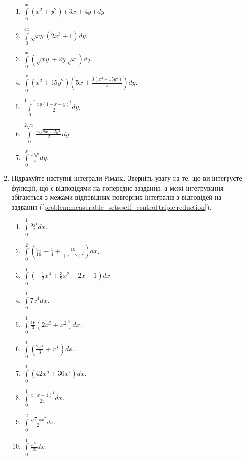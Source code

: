 \begin{enumerate}
\begin{multicols}{2}
\begin{enumerate}[label*=\arabic*.]
        \item $\int\limits_{0}^{x} \left(x^{2}+y^{2}\right) \left(3 x+4 y\right)d y$.
        \item $\int\limits_{0}^{4 x} \sqrt{x y} \left(2 x^{3} + 1\right)  d y$.
        \item $\int\limits_{0}^{x}\left(\sqrt{x y}+2 {{y}}\, \sqrt{ x}\right)d y$.
        \item $\int\limits_{0}^{x}\left(x^{2}+15 y^{2}\right)\left(5 x +\frac{3 \left(x^{2}+15 y^{2}\right)}{4}\right)d y$.
        \item $\int\limits_{0}^{1-x}\frac{x y \left(1-x-y\right)^{2}}{2}d y$.
        \item $\int\limits_{0}^{2 {\sqrt{x}}}\frac{x \sqrt{8 x - 2 y^{2}}}{2}d y$.
        \item $\int\limits_{0}^{x}\frac{x^{5} y^{6}}{4}d y$.
    \end{enumerate}
\end{multicols}
\item\label{problem:measurable_sets:self_control:triple:outer} Підрахуйте наступні інтеграли Рімана. Зверніть увагу на те, що ви інтегруєте функціїї, що є відповідями на попереднє завдання, а межі інтегрування збігаються з межами відповідних повторних інтегралів з відповідей на задвання (\ref{problem:measurable_sets:self_control:triple:reduction}).
\begin{multicols}{2}
    \begin{enumerate}[label*=\arabic*.]
        \item $\int\limits_{0}^{1}\frac{9 x^{4}}{2}d x$.
        \item $\int\limits_{0}^{2}\left(\frac{5 x}{16}-\frac{5}{4}+\frac{10}{\left(x+2\right)^{2}}\right)d x$.
        \item $\int\limits_{0}^{1}\left(-\frac{1}{2} x^{4}+\frac{3}{2} x^{2}-2 x+1\right)d x$.
        \item $\int\limits_{0}^{1}7 x^{4}d x$.
        \item $\int\limits_{0}^{1}\frac{16}{3}\left(2 x^{5} + x^{2}\right)d x$.
        \item $\int\limits_{0}^{1}\left(\frac{2 x^{2}}{3}+x^{\frac{5}{2}}\right)d x$.
        \item $\int\limits_{0}^{1}\left(42 x^{5}+30 x^{4}\right)d x$.
        \item $\int\limits_{0}^{1}\frac{x \left(x-1\right)^{4}}{24}d x$.
        \item $\int\limits_{0}^{2}\frac{\sqrt{2}\, \pi x^{2} }{2}d x$.
        \item $\int\limits_{0}^{1}\frac{x^{12}}{28}d x$.
    \end{enumerate}
\end{multicols}
\end{enumerate}
